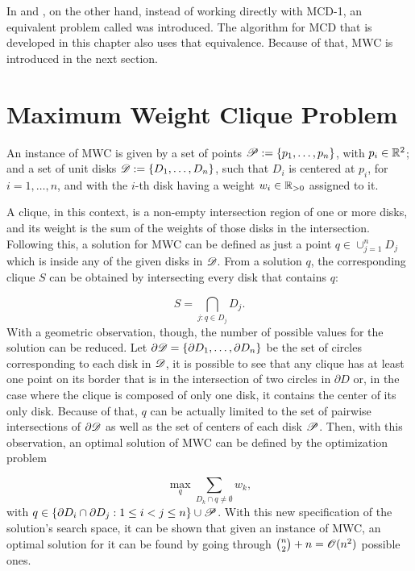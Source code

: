 In  and , on the other hand, instead of working directly with MCD-1, an equivalent problem called  was introduced. The algorithm for MCD that is developed in this chapter also uses that equivalence. Because of that, MWC is introduced in the next section.

\section{Maximum Weight Clique Problem}

An instance of MWC is given by a set of points $\mathscr{P}:=\{p_1,\dots,p_n\}$, with $p_i \in \mathbb{R}^2$; and a set of unit disks $\mathscr{D}:=\{D_1,\dots,D_n\}$, such that $D_i$ is centered at $p_i$, for $i=1,\dots,n$, and with the $i$-th disk having a weight $w_i\in \mathbb{R}_{>0}$ assigned to it. 

A clique, in this context, is a non-empty intersection region of one or more disks, and its weight is the sum of the weights of those disks in the intersection.
Following this, a solution for MWC can be defined as just a point $q\in\cup_{j=1}^n D_j$ which is inside any of the given disks in $\mathscr{D}$.
From a solution $q$, the corresponding clique $S$ can be obtained by intersecting every disk that contains $q$:

\begin{equation}
S = \bigcap_{j : q \in D_j} D_j.
\end{equation}
With a geometric observation, though, the number of possible values for the solution can be reduced.
Let $\partial \mathscr{D} = \{ \partial D_1, \dots, \partial D_n \}$ be the set of circles corresponding to each disk in $\mathscr{D}$, it is possible to see that any clique has at least one point on its border that is in the intersection of two circles in $\partial D$ or, in the case where the clique is composed of only one disk, it contains the center of its only disk. Because of that, $q$ can be actually limited to the set of pairwise intersections of $\partial \mathscr{D}$ as well as the set of centers of each disk $\mathscr{P}$. Then, with this observation, an optimal solution of MWC can be defined by the optimization problem

\begin{equation}
\max_{q} \sum_{D_k \cap q \neq \emptyset} w_k,
\end{equation}
with $q \in \{\partial D_i \cap \partial D_j : 1 \le i < j \le n\} \cup \mathscr{P}$. With this new specification of the solution's search space, it can be shown that given an instance of MWC, an optimal solution for it can be found by going through $\binom{n}{2} + n = \mathscr{O}(n^2)$ possible ones.

